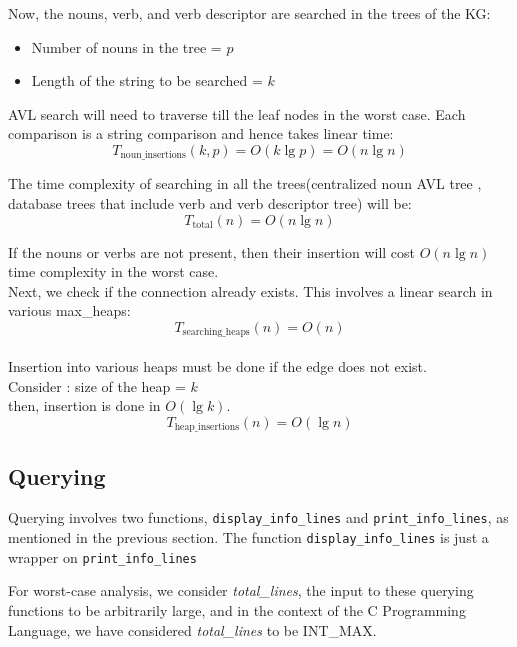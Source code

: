 \documentclass[conference]{IEEEtran}
\begin{document}
Now, the nouns, verb, and verb descriptor are searched in the trees of the KG:
\begin{itemize}
    \item Number of nouns in the tree = $p$
    \item Length of the string to be searched = $k$
\end{itemize}
AVL search will need to traverse till the leaf nodes in the worst case. Each comparison is a string comparison and hence takes linear time:
\begin{equation}
	T_{\text{noun\_insertions}}(k, p) = O(k \lg p) = O(n \lg n)
\end{equation}


The time complexity of searching in all the trees(centralized noun AVL tree , database trees that include verb and verb descriptor tree) will be:
\begin{equation}
	T_{\text{total}}(n) = O(n \lg n)
\end{equation}

If the nouns or verbs are not present, then their insertion  will cost $O(n \lg n)$ time complexity in the worst case.
\\
Next, we check if the connection already exists. This involves a linear search in various max\_heaps:
\begin{equation}
	T_{\text{searching\_heaps}}(n) = O(n)
\end{equation}
\\
Insertion into various heaps must be done if the edge does not exist. \\Consider : size of the heap = $k$
\\then, insertion is done in $O(\lg k)$.
\\
\begin{equation}
	T_{\text{heap\_insertions}}(n) = O(\lg n)
\end{equation}


\subsection{Querying}
Querying involves two functions, \texttt{display\_info\_lines} and
\texttt{print\_info\_lines}, as mentioned in the previous section.
The function \texttt{display\_info\_lines} is just a wrapper on
\texttt{print\_info\_lines}

For worst-case analysis, we consider \textit{total\_lines}, the input to these querying functions to be arbitrarily large, and in the context of the C Programming Language, we have considered \textit{total\_lines} to be INT\_MAX.
\end{document}
